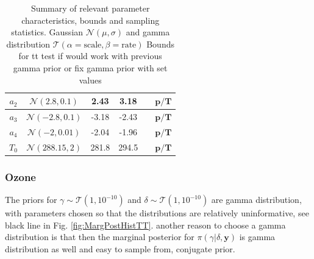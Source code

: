 \begin{table}
\begin{tabular}{ |c||c|c|c|c|c|   }
		$a_{2}$ &  $\mathcal{N}(2.8,0.1)$&2.43 &3.18&&$\bm{p/T}$\\ \hline
		$a_{3}$ &  $\mathcal{N}(-2.8,0.1)$&-3.18 &-2.43&&$\bm{p/T}$\\ \hline
		$a_{4}$ & $\mathcal{N}(-2,0.01)$ &-2.04 &-1.96&&$\bm{p/T}$\\ \hline
		$T_{0}$ &  $\mathcal{N}(288.15,2)$& 281.8 &294.5&&$\bm{p/T}$\\
		\hline
	\end{tabular}
	\caption[Summary of relevant parameter characteristics, bounds and sampling statistics.]{Summary of relevant parameter characteristics, bounds and sampling statistics. Gaussian $\mathcal{N}(\mu,\sigma)$ and gamma distribution $\mathcal{T}(\alpha = \text{scale}, \beta = \text{rate})$
		Bounds for tt test if would work with previous gamma prior or fix gamma prior with set values}
	\label{tab:priors}
\end{table}

\subsubsection{Ozone}
The priors for $\gamma \sim \mathcal{T}(1,10^{-10}) $ and $\delta \sim \mathcal{T}(1,10^{-10})$ are gamma distribution, with parameters chosen so that the distributions are relatively uninformative, see black line in Fig. \ref{fig:MargPostHistTT}.
another reason to choose a gamma distribution is that then the marginal posterior for $\pi(\gamma|\delta,\bm{y})$ is gamma distribution as well and easy to sample from, conjugate prior.

